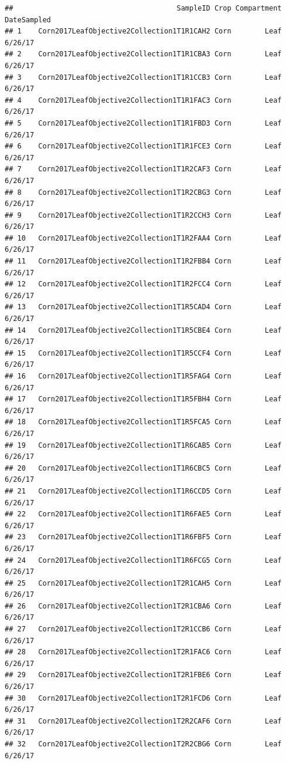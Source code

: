 \documentclass[
]{article}
\begin{document}
\begin{verbatim}
##                                       SampleID Crop Compartment DateSampled
## 1    Corn2017LeafObjective2Collection1T1R1CAH2 Corn        Leaf     6/26/17
## 2    Corn2017LeafObjective2Collection1T1R1CBA3 Corn        Leaf     6/26/17
## 3    Corn2017LeafObjective2Collection1T1R1CCB3 Corn        Leaf     6/26/17
## 4    Corn2017LeafObjective2Collection1T1R1FAC3 Corn        Leaf     6/26/17
## 5    Corn2017LeafObjective2Collection1T1R1FBD3 Corn        Leaf     6/26/17
## 6    Corn2017LeafObjective2Collection1T1R1FCE3 Corn        Leaf     6/26/17
## 7    Corn2017LeafObjective2Collection1T1R2CAF3 Corn        Leaf     6/26/17
## 8    Corn2017LeafObjective2Collection1T1R2CBG3 Corn        Leaf     6/26/17
## 9    Corn2017LeafObjective2Collection1T1R2CCH3 Corn        Leaf     6/26/17
## 10   Corn2017LeafObjective2Collection1T1R2FAA4 Corn        Leaf     6/26/17
## 11   Corn2017LeafObjective2Collection1T1R2FBB4 Corn        Leaf     6/26/17
## 12   Corn2017LeafObjective2Collection1T1R2FCC4 Corn        Leaf     6/26/17
## 13   Corn2017LeafObjective2Collection1T1R5CAD4 Corn        Leaf     6/26/17
## 14   Corn2017LeafObjective2Collection1T1R5CBE4 Corn        Leaf     6/26/17
## 15   Corn2017LeafObjective2Collection1T1R5CCF4 Corn        Leaf     6/26/17
## 16   Corn2017LeafObjective2Collection1T1R5FAG4 Corn        Leaf     6/26/17
## 17   Corn2017LeafObjective2Collection1T1R5FBH4 Corn        Leaf     6/26/17
## 18   Corn2017LeafObjective2Collection1T1R5FCA5 Corn        Leaf     6/26/17
## 19   Corn2017LeafObjective2Collection1T1R6CAB5 Corn        Leaf     6/26/17
## 20   Corn2017LeafObjective2Collection1T1R6CBC5 Corn        Leaf     6/26/17
## 21   Corn2017LeafObjective2Collection1T1R6CCD5 Corn        Leaf     6/26/17
## 22   Corn2017LeafObjective2Collection1T1R6FAE5 Corn        Leaf     6/26/17
## 23   Corn2017LeafObjective2Collection1T1R6FBF5 Corn        Leaf     6/26/17
## 24   Corn2017LeafObjective2Collection1T1R6FCG5 Corn        Leaf     6/26/17
## 25   Corn2017LeafObjective2Collection1T2R1CAH5 Corn        Leaf     6/26/17
## 26   Corn2017LeafObjective2Collection1T2R1CBA6 Corn        Leaf     6/26/17
## 27   Corn2017LeafObjective2Collection1T2R1CCB6 Corn        Leaf     6/26/17
## 28   Corn2017LeafObjective2Collection1T2R1FAC6 Corn        Leaf     6/26/17
## 29   Corn2017LeafObjective2Collection1T2R1FBE6 Corn        Leaf     6/26/17
## 30   Corn2017LeafObjective2Collection1T2R1FCD6 Corn        Leaf     6/26/17
## 31   Corn2017LeafObjective2Collection1T2R2CAF6 Corn        Leaf     6/26/17
## 32   Corn2017LeafObjective2Collection1T2R2CBG6 Corn        Leaf     6/26/17

\end{verbatim}
\end{document}
